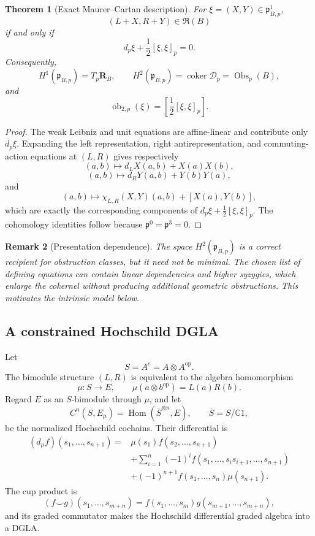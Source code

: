 \documentclass[11pt]{amsart}
\newtheorem{theorem}{Theorem}[section]
\newtheorem{remark}[theorem]{Remark}
\newcommand{\Hom}{\operatorname{Hom}}
\newcommand{\coker}{\operatorname{coker}}
\newcommand{\Obs}{\operatorname{Obs}}
\newcommand{\Rfib}{\mathfrak R}
\newcommand{\cD}{\mathscr D}
\newcommand{\C}{\mathbb C}
\newcommand{\gpres}{\mathfrak p}
\begin{document}
\begin{theorem}[Exact Maurer--Cartan description]\label{thm:presentation-mc}
For $\xi=(X,Y)\in\gpres_{B,p}^{1}$,
\[
(L+X,R+Y)\in\Rfib(B)
\]
if and only if
\[
d_p\xi+\frac12[\xi,\xi]_p=0.
\]
Consequently,
\[
H^1(\gpres_{B,p})=T_p\mathbf R_B,
\qquad
H^2(\gpres_{B,p})=\coker\cD_p=\Obs_p(B),
\]
and
\[
\operatorname{ob}_{2,p}(\xi)
=
\left[\frac12[\xi,\xi]_p\right].
\]
\end{theorem}

\begin{proof}
The weak Leibniz and unit equations are affine-linear and contribute only $d_p\xi$.  Expanding the left representation, right antirepresentation, and commuting-action equations at $(L,R)$ gives respectively
\[
(a,b)\longmapsto d_LX(a,b)+X(a)X(b),
\]
\[
(a,b)\longmapsto d_RY(a,b)+Y(b)Y(a),
\]
and
\[
(a,b)\longmapsto\chi_{L,R}(X,Y)(a,b)+[X(a),Y(b)],
\]
which are exactly the corresponding components of $d_p\xi+\tfrac12[\xi,\xi]_p$.  The cohomology identities follow because $\gpres^0=\gpres^3=0$.
\end{proof}

\begin{remark}[Presentation dependence]
The space $H^2(\gpres_{B,p})$ is a correct recipient for obstruction classes, but it need not be minimal.  The chosen list of defining equations can contain linear dependencies and higher syzygies, which enlarge the cokernel without producing additional geometric obstructions.  This motivates the intrinsic model below.
\end{remark}

\subsection{A constrained Hochschild DGLA}\label{subsec:constrained-hochschild}

Let
\[
S=A^e=A\otimes A^{\mathrm{op}}.
\]
The bimodule structure $(L,R)$ is equivalent to the algebra homomorphism
\[
\mu:S\longrightarrow E,
\qquad
\mu(a\otimes b^{\mathrm{op}})=L(a)R(b).
\]
Regard $E$ as an $S$-bimodule through $\mu$, and let
\[
C^n(S,E_\mu)=\Hom(\overline{S}^{\otimes n},E),
\qquad
\overline S=S/\C1,
\]
be the normalized Hochschild cochains.  Their differential is
\begin{align*}
(d_\mu f)(s_1,\ldots,s_{n+1})
={}&\mu(s_1)f(s_2,\ldots,s_{n+1})\\
&+\sum_{i=1}^{n}(-1)^if(s_1,\ldots,s_is_{i+1},\ldots,s_{n+1})\\
&+(-1)^{n+1}f(s_1,\ldots,s_n)\mu(s_{n+1}).
\end{align*}
The cup product is
\[
(f\smile g)(s_1,\ldots,s_{m+n})
=f(s_1,\ldots,s_m)g(s_{m+1},\ldots,s_{m+n}),
\]
and its graded commutator makes the Hochschild differential graded algebra into a DGLA.
\end{document}
